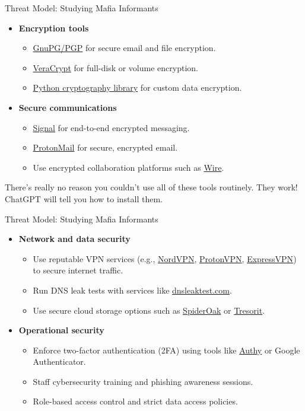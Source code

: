 \documentclass[aspectratio=169]{beamer}
\begin{document}
\begin{frame}{Threat Model: Studying Mafia Informants}
  \begin{itemize}
    \item[] \textbf{Encryption tools}
      \begin{itemize}
        \item \href{https://gnupg.org/}{GnuPG/PGP} for secure email and file encryption.
        \item \href{https://www.veracrypt.fr/en/Home.html}{VeraCrypt} for full-disk or volume encryption.
        \item \href{https://cryptography.io/en/latest/}{Python cryptography library} for custom data encryption.
      \end{itemize}
    \item[] \textbf{Secure communications}
      \begin{itemize}
        \item \href{https://signal.org/}{Signal} for end-to-end encrypted messaging.
        \item \href{https://protonmail.com/}{ProtonMail} for secure, encrypted email.
        \item Use encrypted collaboration platforms such as \href{https://wire.com/en/}{Wire}.
      \end{itemize}
  \end{itemize}

  \pause
  There's really no reason you couldn't use all of these tools routinely. They work! ChatGPT will tell you how to install them.
\end{frame}


\begin{frame}{Threat Model: Studying Mafia Informants}
  \begin{itemize}
    \item[] \textbf{Network and data security}
      \begin{itemize}
        \item Use reputable VPN services (e.g., \href{https://nordvpn.com}{NordVPN}, \href{https://protonvpn.com/}{ProtonVPN}, \href{https://www.expressvpn.com/}{ExpressVPN}) to secure internet traffic.
        \item Run DNS leak tests with services like \href{https://www.dnsleaktest.com}{dnsleaktest.com}.
        \item Use secure cloud storage options such as \href{https://spideroak.com/}{SpiderOak} or \href{https://tresorit.com/}{Tresorit}.
      \end{itemize}
    \item[] \textbf{Operational security}
      \begin{itemize}
        \item Enforce two-factor authentication (2FA) using tools like \href{https://authy.com/}{Authy} or Google Authenticator.
        \item Staff cybersecurity training and phishing awareness sessions.
        \item Role-based access control and strict data access policies.
      \end{itemize}
  \end{itemize}
\end{frame}
\end{document}
